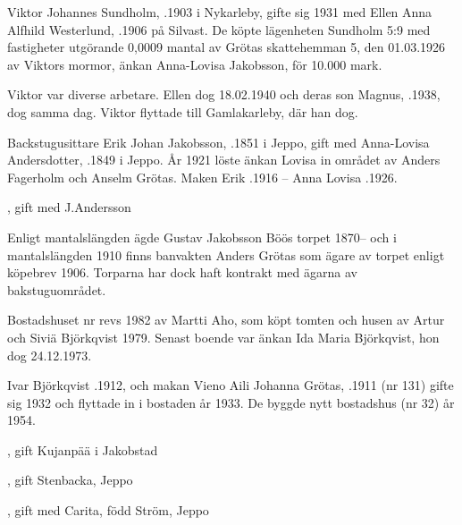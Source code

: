 Viktor Johannes Sundholm, .1903 i Nykarleby, gifte sig 1931 med Ellen Anna Alfhild Westerlund, .1906 på Silvast. De köpte lägenheten Sundholm 5:9 med fastigheter utgörande 0,0009 mantal av Grötas skattehemman 5, den 01.03.1926 av Viktors mormor, änkan Anna-Lovisa Jakobsson, för 10.000 mark.

Viktor var diverse arbetare. Ellen dog 18.02.1940 och deras son Magnus, .1938, dog samma dag. Viktor flyttade till Gamlakarleby, där han dog.


Backstugusittare Erik Johan Jakobsson, .1851 i Jeppo, gift med Anna-Lovisa Andersdotter, .1849 i Jeppo. År 1921 löste änkan Lovisa in området av Anders Fagerholm och Anselm Grötas.
Maken Erik .1916  --  Anna Lovisa .1926.
\begin{jhchildren}
  \item {}
  \item {}, gift med J.Andersson
  \item {}
  \item {}
  \item {}
\end{jhchildren}
Enligt  mantalslängden ägde Gustav Jakobsson Böös torpet 1870-- och i mantalslängden 1910 finns banvakten Anders Grötas som ägare av torpet enligt köpebrev 1906. Torparna har dock haft kontrakt med ägarna av bakstuguområdet.




Bostadshuset nr  revs 1982 av Martti Aho, som köpt tomten och husen av Artur och Siviä Björkqvist 1979. Senast boende var änkan Ida Maria Björkqvist, hon dog 24.12.1973.

Ivar Björkqvist .1912, och makan Vieno Aili Johanna Grötas, .1911 (nr 131) gifte sig 1932 och flyttade in i bostaden år 1933. De byggde nytt bostadshus (nr 32) år 1954.
\begin{jhchildren}
  \item {}, gift Kujanpää i Jakobstad
  \item {}, gift Stenbacka, Jeppo
  \item {}, gift med Carita, född Ström, Jeppo
\end{jhchildren}


